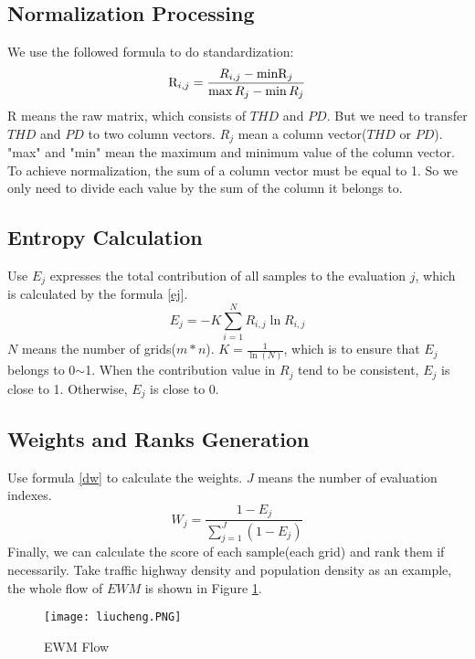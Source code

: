 \documentclass{mcmthesis}
\begin{document}
   \subsection{Normalization Processing}
   We use the followed formula to do standardization:
   \begin{equation}
   {{\rm{R}}_{i,j}} = \frac{{{R_{i,j}} - {{{\mathop{\rm minR}\nolimits} }_j}}}{{\max {R_j} - \min {R_j}}}
   \end{equation}
   R means the raw matrix, which consists of $THD$ and $PD$. But we need to transfer $THD$ and $PD$ to two column vectors. $R_j$ mean a column vector($THD$ or $PD$). "max" and "min" mean the maximum and minimum value of the column vector. To achieve normalization, the sum of a column vector must be equal to 1. So we only need to divide each value by the sum of the column it belongs to.
     
   \subsection{Entropy Calculation}
   Use $E_j$ expresses the total contribution of all samples to the evaluation $j$, which is calculated by the formula \ref{ej}.
   \begin{equation}
   \label{ej}
   {E_j} =  - K\sum\limits_{i = 1}^N {{R_{i,j}}\ln {R_{i,j}}} 
   \end{equation}
   $N$ means the number of grids($m*n$). $K = \frac{1}{{\ln (N)}}$, which is to ensure that $E_j$ belongs to 0$\sim$1. When the contribution value in $R_j$ tend to be consistent, $E_j$ is close to 1. Otherwise, $E_j$ is close to 0. 
     \subsection{Weights and Ranks Generation}
   Use formula \ref{dw} to calculate the weights. $J$ means the number of evaluation indexes.
   \begin{equation}
   {W_j} = \frac{{1 - {E_j}}}{{\sum\limits_{j = 1}^J {(1 - {E_j})} }} \label{dw}
   \end{equation}
   Finally, we can calculate the score of each sample(each grid) and rank them if necessarily.
   Take traffic highway density and population density as an example, the whole flow of $EWM$ is shown in Figure \ref{liucheng}.
      \begin{figure}[!htbp]                                         
    	\centering
    	\texttt{[image: liucheng.PNG]}      
    	\caption{ EWM Flow  }                            
    	\label{liucheng}                                          
    \end{figure}
  
\end{document}
